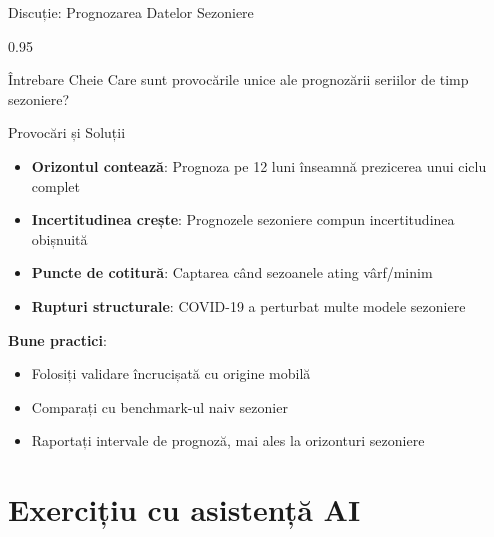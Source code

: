 \documentclass[9pt, aspectratio=169, t]{beamer}
\begin{document}
\begin{frame}{Discuție: Prognozarea Datelor Sezoniere}
    \begin{cminipage}{0.95\textwidth}
    \begin{block}{Întrebare Cheie}
        Care sunt provocările unice ale prognozării seriilor de timp sezoniere?
    \end{block}

    \vspace{0.2cm}

    \begin{block}{Provocări și Soluții}
        \begin{itemize}\setlength{\itemsep}{0pt}
            \item \textbf{Orizontul contează}: Prognoza pe 12 luni înseamnă prezicerea unui ciclu complet
            \item \textbf{Incertitudinea crește}: Prognozele sezoniere compun incertitudinea obișnuită
            \item \textbf{Puncte de cotitură}: Captarea când sezoanele ating vârf/minim
            \item \textbf{Rupturi structurale}: COVID-19 a perturbat multe modele sezoniere
        \end{itemize}

        \vspace{0.2cm}
        \textbf{Bune practici}:
        \begin{itemize}\setlength{\itemsep}{0pt}
            \item Folosiți validare încrucișată cu origine mobilă
            \item Comparați cu benchmark-ul naiv sezonier
            \item Raportați intervale de prognoză, mai ales la orizonturi sezoniere
        \end{itemize}
    \end{block}
    \end{cminipage}
\end{frame}

\section{Exercițiu cu asistență AI}
\end{document}
